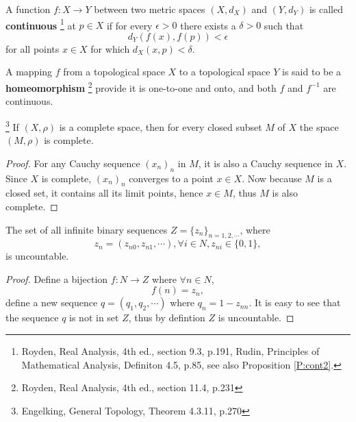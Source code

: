 \begin{definition} \label{D:cont_metr}
A function $f:X\to Y$ between two metric spaces $(X,d_X)$ and $(Y,d_Y)$ is
called \textbf{continuous}
  \footnote{Royden, Real Analysis, 4th ed., section 9.3, p.191, Rudin,
     Principles of Mathematical Analysis, Definiton 4.5, p.85,
     see also Proposition \ref{P:cont2}.}
at $p\in X$ if for every $\epsilon>0$ there exists a $\delta>0$ such that
\[
	d_Y (f(x), f(p)) < \epsilon
\]
for all points $x\in X$ for which $d_X(x,p)<\delta$.
\end{definition}

\begin{definition}
A mapping $f$ from a topological space $X$ to a topological space $Y$ is
said to be a \textbf{homeomorphism}
	\footnote{Royden, Real Analysis, 4th ed., section 11.4, p.231}
provide it is one-to-one and onto, and both $f$ and $f^{-1}$ are continuous.
\end{definition}

\begin{proposition} \label{P:closed_complete}
  \footnote{Engelking, General Topology, Theorem 4.3.11, p.270}
If $(X,\rho)$ is a complete space, then for every closed subset $M$ of $X$ the
space $(M,\rho)$ is complete.
\end{proposition}
\begin{proof}
For any Cauchy sequence $(x_n)_n$ in $M$, it is also a Cauchy sequence in $X$.
Since $X$ is complete, $(x_n)_n$ converges to a point $x\in X$. Now because
$M$ is a closed set, it contains all its limit points, hence $x\in M$, thus
$M$ is also complete.
\end{proof}

\begin{lemma} \label{L:binary_seq}
The set of all infinite binary sequences $Z=\{ z_n \}_{n=1,2,\cdots}$, where
\[
  z_n = (z_{n0}, z_{n1}, \cdots),  \forall i\in N, z_{ni}\in \{0,1\},
\]
is uncountable.
\end{lemma}
\begin{proof}
Define a bijection $f:N\to Z$ where $\forall n\in N$,
\[
  f(n) = z_n,
\]
define a new sequence $q=(q_1, q_2, \cdots)$ where
$q_n=1-z_{nn}$. It is easy to see that the sequence $q$ is not in set $Z$, thus
by defintion $Z$ is uncountable.
\end{proof}

